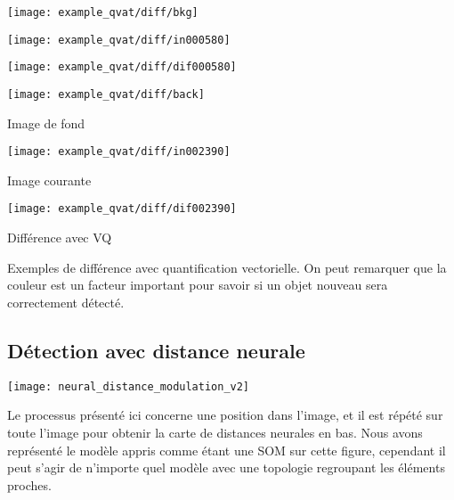 	\begin{figureth}
		\begin{subfigureth}{.32\textwidth}
			\texttt{[image: example\_qvat/diff/bkg]}
		\end{subfigureth}
		\begin{subfigureth}{.32\textwidth}
			\texttt{[image: example\_qvat/diff/in000580]}
		\end{subfigureth}
		\begin{subfigureth}{.32\textwidth}
			\texttt{[image: example\_qvat/diff/dif000580]}
		\end{subfigureth}

		\begin{subfigureth}{.32\textwidth}
			\texttt{[image: example\_qvat/diff/back]} \caption{Image de fond}
		\end{subfigureth}
		\begin{subfigureth}{.32\textwidth}
			\texttt{[image: example\_qvat/diff/in002390]} \caption{Image courante}
		\end{subfigureth}
		\begin{subfigureth}{.32\textwidth}
			\texttt{[image: example\_qvat/diff/dif002390]} \caption{Différence avec VQ}
		\end{subfigureth}

		\caption[Exemples de différence avec quantification vectorielle]{Exemples de différence avec quantification vectorielle. On peut remarquer que la couleur est un facteur important pour savoir si un objet nouveau sera correctement détecté.}\label{fig:visu-vq}
	\end{figureth}

	\subsection{Détection avec distance neurale}

	\begin{figureth}
		\texttt{[image: neural\_distance\_modulation\_v2]}
		\caption[Détection de nouveauté avec topologie]{Le processus présenté ici concerne une position dans l'image, et il est répété sur toute l'image pour obtenir la carte de distances neurales en bas. Nous avons représenté le modèle appris comme étant une SOM sur cette figure, cependant il peut s'agir de n'importe quel modèle avec une topologie regroupant les éléments proches.}\label{fig:img:topo}
	\end{figureth}

